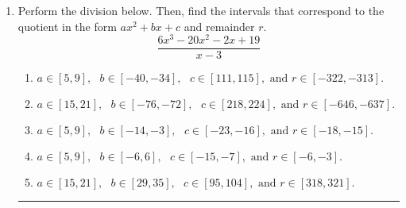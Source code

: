 \documentclass[14pt]{extbook}
\newcommand{\litem}[1]{\item#1\hspace*{-1cm}\rule{\textwidth}{0.4pt}}
\begin{document}
\begin{enumerate}
{\begin{enumerate}[label=\Alph*.]
\end{enumerate} }
\litem{
Perform the division below. Then, find the intervals that correspond to the quotient in the form $ax^2+bx+c$ and remainder $r$.\[ \frac{6x^{3} -20 x^{2} -2 x + 19}{x -3} \]\begin{enumerate}[label=\Alph*.]
\item \( a \in [5, 9], \text{   } b \in [-40, -34], \text{   } c \in [111, 115], \text{   and   } r \in [-322, -313]. \)
\item \( a \in [15, 21], \text{   } b \in [-76, -72], \text{   } c \in [218, 224], \text{   and   } r \in [-646, -637]. \)
\item \( a \in [5, 9], \text{   } b \in [-14, -3], \text{   } c \in [-23, -16], \text{   and   } r \in [-18, -15]. \)
\item \( a \in [5, 9], \text{   } b \in [-6, 6], \text{   } c \in [-15, -7], \text{   and   } r \in [-6, -3]. \)
\item \( a \in [15, 21], \text{   } b \in [29, 35], \text{   } c \in [95, 104], \text{   and   } r \in [318, 321]. \)

\end{enumerate} }
\end{enumerate}
\end{document}
